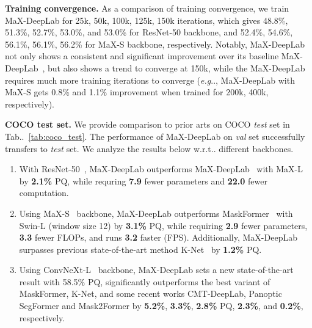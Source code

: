 \documentclass[runningheads]{llncs}
\makeatletter
\DeclareRobustCommand\onedot{\futurelet\@let@token\@onedot}
\def\@onedot{\ifx\@let@token.\else.\null\fi\xspace}
\def\eg{\emph{e.g}\onedot} \def\Eg{\emph{E.g}\onedot}
\def\wrt{w.r.t\onedot} \def\dof{d.o.f\onedot}
\newcommand{\tabref}[1]{Tab\onedot~\ref{#1}}
\makeatother
\begin{document}
\textbf{Training convergence.}\quad
As a comparison of training convergence, we train MaX-DeepLab for 25k, 50k, 100k, 125k, 150k iterations, which gives 48.8\%, 51.3\%, 52.7\%, 53.0\%, and 53.0\% for ResNet-50 backbone, and 52.4\%, 54.6\%, 56.1\%, 56.1\%, 56.2\% for MaX-S backbone, respectively.
Notably, MaX-DeepLab not only shows a consistent and significant improvement over its baseline MaX-DeepLab~\cite{wang2021max}, but also shows a trend to converge at 150k, while the MaX-DeepLab requires much more training iterations to converge (\eg, MaX-DeepLab with MaX-S gets 0.8\% and 1.1\% improvement when trained for 200k, 400k, respectively).

\textbf{COCO test set.}\quad
We provide comparison to prior arts on COCO \textit{test} set in \tabref{tab:coco_test}. The performance of MaX-DeepLab on \textit{val} set successfully transfers to \textit{test} set. We analyze the results below \wrt different backbones.

\begin{enumerate}
    \item With ResNet-50~\cite{he2016deep}, MaX-DeepLab outperforms MaX-DeepLab~\cite{wang2021max} with MaX-L by \textbf{2.1\%} PQ, while requring \textbf{7.9} fewer parameters and \textbf{22.0} fewer computation.
    \item Using MaX-S~\cite{wang2021max} backbone, MaX-DeepLab outperforms  MaskFormer~\cite{cheng2021per} with Swin-L (window size 12) by \textbf{3.1\%} PQ, while requiring \textbf{2.9} fewer parameters, \textbf{3.3} fewer FLOPs, and runs \textbf{3.2} faster (FPS).
    Additionally, MaX-DeepLab surpasses previous state-of-the-art method K-Net~\cite{zhang2021k} by \textbf{1.2\%} PQ.
    \item Using ConvNeXt-L~\cite{liu2022convnet} backbone, MaX-DeepLab sets a new state-of-the-art result with 58.5\% PQ, significantly outperforms the best variant of MaskFormer, K-Net, and some recent works CMT-DeepLab, Panoptic SegFormer and Mask2Former by \textbf{5.2\%}, \textbf{3.3\%}, \textbf{2.8\%} PQ, \textbf{2.3\%}, and \textbf{0.2\%}, respectively. 
\end{enumerate}
\end{document}
